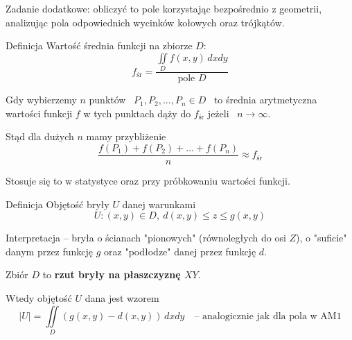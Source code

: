 Zadanie dodatkowe: obliczyć to pole korzystając bezpośrednio z geometrii, analizując pola odpowiednich wycinków kołowych oraz trójkątów.

\begin{tw}{Definicja}
    Wartość średnia funkcji na zbiorze $D$:
    \[ f_{\text{śr}} = \frac{\displaystyle\iint\limits_D  f(x,y) \, dxdy }{\text{pole } D} \]

    Gdy wybierzemy $n$ punktów \ $ P_1, P_2, ..., P_n \in D $ \ to średnia arytmetyczna wartości funkcji $f$ w tych punktach dąży do $ f_{\text{śr}} $
    jeżeli \ $ n \to \infty $.

    Stąd dla dużych $n$ mamy przybliżenie
    \[ \frac{f(P_1) + f(P_2) + ... + f(P_n)}{n} \approx f_{\text{śr}} \]
\end{tw}

Stosuje się to w statystyce oraz przy próbkowaniu wartości funkcji.

\begin{tw}{Definicja}
    Objętość bryły $U$ danej warunkami
    \[ U : (x,y) \in D, \ d(x,y) \leq z \leq g(x,y) \]

    Interpretacja -- bryła o ścianach "pionowych" (równoległych do osi $Z$), o "suficie" danym przez funkcję $g$ oraz "podłodze" danej przez funkcję $d$.

    Zbiór $D$ to \textbf{rzut bryły na płaszczyznę $XY$}.

    Wtedy objętość $U$ dana jest wzorem
    \[ |U| = \iint\limits_D (g(x,y) - d(x,y)) \, dxdy \quad \text{-- analogicznie jak dla pola w AM1} \]
\end{tw}

